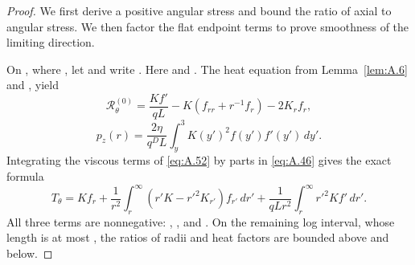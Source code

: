 \begin{proof}
We first derive a positive angular stress and bound the ratio of axial to angular stress. We then factor the flat endpoint terms
to prove smoothness of the limiting direction.

On , where , let
 and write . Here
 and . The heat equation from Lemma~\ref{lem:A.6} and
,
 yield
\begin{equation}
  \mathscr R_\theta^{(0)}
  =\frac{Kf'}{qL}-K(f_{rr}+r^{-1}f_r)-2K_rf_r,
  \tag{A.52}\label{eq:A.52}
\end{equation}
\begin{equation}
  p_z(r)=\frac{2\eta}{q^DL}\int_y^3K(y')^2f(y')f'(y')\,dy'.
  \tag{A.53}\label{eq:A.53}
\end{equation}
Integrating the viscous terms of \eqref{eq:A.52} by parts in \eqref{eq:A.46} gives the exact formula
\begin{equation}
  T_\theta
  =Kf_r+\frac1{r^2}\int_r^\infty(r'K-r'^2K_{r'})f_{r'}\,dr'
  +\frac1{qLr^2}\int_r^\infty r'^2Kf'\,dr'.
  \tag{A.54}\label{eq:A.54}
\end{equation}
All three terms are nonnegative: , , and
. On the remaining log interval, whose length is at most
, the ratios of radii and heat factors are bounded above and below.


\end{proof}

